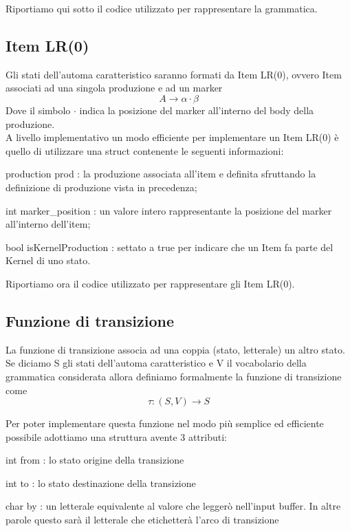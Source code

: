 \documentclass[12pt]{article}
\begin{document}
Riportiamo qui sotto il codice utilizzato per rappresentare la grammatica.




\subsection{Item LR(0)}
Gli stati dell'automa caratteristico saranno formati da Item LR(0), ovvero Item associati ad una singola produzione e ad un marker
$$
A \to \alpha\cdot\beta
$$ 
Dove il simbolo $\cdot$ indica la posizione del marker all'interno del body della produzione. \\

A livello implementativo un modo efficiente per implementare un Item LR(0) è quello di utilizzare una struct contenente le seguenti informazioni:
\begin{list}{-}{}
\item production prod : la produzione associata all'item e definita sfruttando la definizione di produzione vista in precedenza;
\item int marker\_position : un valore intero rappresentante la posizione del marker all'interno dell'item;
\item bool isKernelProduction : settato a true per indicare che un Item fa parte del Kernel di uno stato.
\end{list}

Riportiamo ora il codice utilizzato per rappresentare gli Item LR(0).


\subsection{Funzione di transizione}
La funzione di transizione associa ad una coppia (stato, letterale) un altro stato. Se diciamo S gli stati dell'automa caratteristico e V il vocabolario della grammatica considerata allora definiamo formalmente la funzione di transizione come
$$
\tau \colon (S, V) \to S
$$

Per poter implementare questa funzione nel modo più semplice ed efficiente possibile adottiamo una struttura avente 3 attributi:
\begin{list}{-}{}
\item int from : lo stato origine della transizione
\item int to : lo stato destinazione della transizione
\item char by : un letterale equivalente al valore che leggerò nell'input buffer. In altre parole questo sarà il letterale che etichetterà l'arco di transizione 
\end{list}
\end{document}
